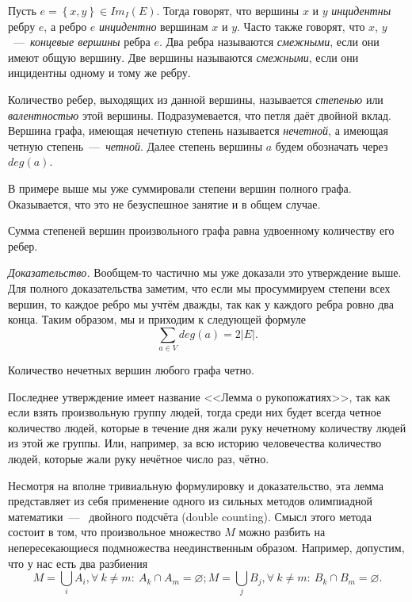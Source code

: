 
\begin{definition}
	Пусть $e = \left\lbrace x, y \right\rbrace \in Im_{I}(E)$. Тогда говорят, что вершины $x$ и $y$ \emph{инцидентны} ребру $e$, а ребро $e$ \emph{инцидентно} вершинам $x$ и $y$. Часто также говорят, что $x$, $y$~---~\emph{концевые вершины} ребра $e$. Два ребра называются \emph{смежными}, если они имеют общую вершину. Две вершины называются \emph{смежными}, если они инцидентны одному и тому же ребру.
\end{definition}


\begin{definition}
	Количество ребер, выходящих из данной вершины, называется \emph{степенью} или \emph{валентностью} этой вершины. Подразумевается, что петля даёт двойной вклад. Вершина графа, имеющая нечетную степень называется \emph{нечетной}, а имеющая четную степень~---~\emph{четной}. Далее степень вершины $a$ будем обозначать через $deg(a)$.
\end{definition}

	В примере выше мы уже суммировали степени вершин полного графа. Оказывается, что это не безуспешное занятие и в общем случае.

\begin{lemma*}[о рукопожатиях]
	Сумма степеней вершин произвольного графа равна удвоенному количеству его ребер.
	
	\emph{Доказательство.} Вообщем-то частично мы уже доказали это утверждение выше. Для полного доказательства заметим, что если мы просуммируем степени всех вершин, то каждое ребро мы учтём дважды, так как у каждого ребра ровно два конца. Таким образом, мы и приходим к следующей формуле $$\sum_{a \in V} deg(a) = 2|E|.$$
\end{lemma*}

\begin{consequence}
	Количество нечетных вершин любого графа четно.
\end{consequence}

	Последнее утверждение имеет название <<Лемма о рукопожатиях>>, так как если взять произвольную группу людей, тогда среди них будет всегда четное количество людей, которые в течение дня жали руку нечетному количеству людей из этой же группы. Или, например, за всю историю человечества количество людей, которые жали руку нечётное число раз, чётно.

	Несмотря на вполне тривиальную формулировку и доказательство, эта лемма представляет из себя применение одного из сильных методов олимпиадной математики~---~ двойного подсчёта (double counting). Смысл этого метода состоит в том, что произвольное множество $M$ можно разбить на непересекающиеся подмножества неединственным образом. Например, допустим, что у нас есть два разбиения 
$$M = \bigcup_i A_i, \forall \!\ k \neq m \colon \!\ A_k \cap A_m = \varnothing; M = \bigcup_j B_j,  \forall \!\ k \neq m \colon \!\ B_k \cap B_m = \varnothing.$$

